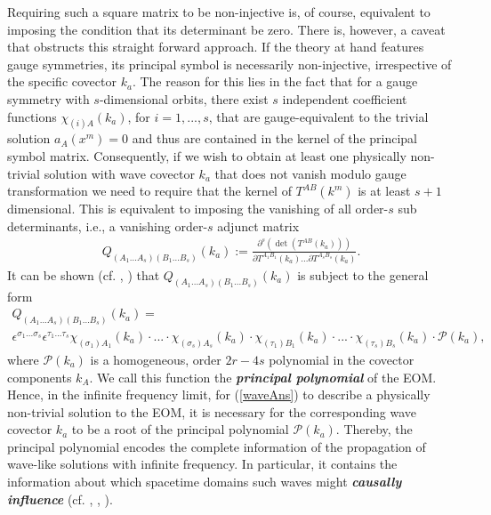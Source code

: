 \documentclass[%
preprint,
titlepage,
nofootinbib,
amsmath,amssymb,
showkeys,
aps,
prd,
floatfix,
]{revtex4-2}
\begin{document}
Requiring such a square matrix to be non-injective is, of course, equivalent to imposing the condition that its determinant be zero. There is, however, a caveat that obstructs this straight forward approach. If the theory at hand features gauge symmetries, its principal symbol is necessarily non-injective, irrespective of the specific covector $k_a$. 
The reason for this lies in the fact that for a gauge symmetry with $s$-dimensional orbits, there exist $s$ independent coefficient functions $\chi_{(i)A}(k_a)$, for $i = 1,...,s$, that are gauge-equivalent to the trivial solution $a_A(x^m)=0$ and thus are contained in the kernel of the principal symbol matrix. 
Consequently, if we wish to obtain at least one physically non-trivial solution with wave covector $k_a$ that does not vanish modulo gauge transformation we need to require that the kernel of $T^{AB}(k^m)$ is at least $s+1$ dimensional. This is equivalent to imposing the vanishing of all order-$s$ sub determinants, i.e., a vanishing order-$s$ adjunct matrix
\begin{align}
    Q_{(A_1...A_s) (B_1...B_s)}(k_a) := \frac{\partial^s (\operatorname{det}(T^{AB}(k_a)))}{\partial T^{A_1 B_1}(k_a) ... \partial T^{A_s B_s}(k_a)}.
\end{align}  
It can be shown (cf. \cite{2018PhRvD..97h4036D}, \cite{2009JPhA...42U5402I}) that $Q_{(A_1...A_s) (B_1...B_s)}(k_a)$ is subject to the general form
\begin{multline}
    Q_{(A_1...A_s) (B_1...B_s)}(k_a) =\\ \epsilon^{\sigma_1...\sigma_s} \epsilon^{\tau_1...\tau_s} \chi_{(\sigma_1)A_1}(k_a) \cdot ... 
    \cdot \chi_{(\sigma_s)A_s}(k_a) \cdot \chi_{(\tau_1)B_1}(k_a) \cdot ... \cdot \chi_{(\tau_s)B_s}(k_a) \cdot \mathcal{P}(k_a),
\end{multline}
where $\mathcal{P}(k_a)$ is a homogeneous, order $2r-4s$ polynomial in the covector components $k_A$. We call this function the \textit{\textbf{principal polynomial}} of the EOM.
Hence, in the infinite frequency limit, for (\ref{waveAns}) to describe a physically non-trivial solution to the EOM, it is necessary for the corresponding wave covector $k_a$ to be a root of the principal polynomial $\mathcal{P}(k_a)$. 
Thereby, the principal polynomial encodes the complete information of the propagation of wave-like solutions with infinite frequency. In particular, it contains the information about which spacetime domains such waves might \textit{\textbf{causally influence}} (cf. \cite{2012arXiv1211.1914K}, \cite{seiler2009involution}, \cite{2011PhRvD..83d4047R}).
\end{document}
